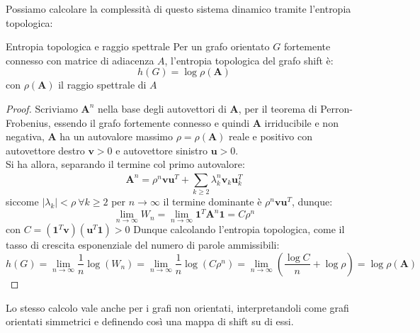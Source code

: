 Possiamo calcolare la complessità di questo sistema dinamico tramite l'entropia topologica:
\begin{boxb}{Entropia topologica e raggio spettrale}
   Per un grafo orientato $G$ fortemente connesso con matrice di adiacenza $A$, l'entropia topologica del grafo shift è:
   \begin{equation}
    h(G)=\log \rho(\mathbf{A})
   \end{equation} 
   con $\rho(\mathbf{A})$ il raggio spettrale di $A$
\end{boxb}

\begin{proof}
Scriviamo $\mathbf{A}^n$ nella base degli autovettori di $\mathbf{A}$, per il teorema di Perron-Frobenius, essendo il grafo fortemente connesso e quindi $\mathbf{A}$ irriducibile e non negativa, $\mathbf{A}$ ha un autovalore massimo $\rho=\rho(\mathbf{A})$ reale e positivo con autovettore destro $\mathbf{v}>0$ e autovettore sinistro $\mathbf{u}>0$.\\
Si ha allora, separando il termine col primo autovalore:
\begin{equation}
\mathbf{A}^n=\rho^n\mathbf{v}\mathbf{u}^T + \sum_{k \ge 2}^{}\lambda_k^n \mathbf{v}_k\mathbf{u}_k^T
\end{equation}
siccome $\left\lvert \lambda_k\right\rvert < \rho \ \forall k \ge 2$ per $n \to \infty$ il termine dominante è $\rho^n\mathbf{v}\mathbf{u}^T$, dunque:
\begin{equation}
    \lim_{n \to \infty}W_n=\lim_{n \to \infty }\mathbf{1}^T\mathbf{A}^n\mathbf{1} = C \rho^n
\end{equation}
con $C=(\mathbf{1}^T\mathbf{v})(\mathbf{u}^T\mathbf{1}) >0$
Dunque calcolando l'entropia topologica, come il tasso di crescita esponenziale del numero di parole ammissibili:
\begin{equation}
    h(G)=\lim_{n \to \infty}\frac{1}{n}\log(W_n)=\lim_{n \to \infty} \frac{1}{n} \log(C \rho^n)=\lim_{n \to \infty} \left( \frac{\log C}{n}+\log \rho\right)=\log \rho(\mathbf{A})
\end{equation}
\end{proof}
Lo stesso calcolo vale anche per i grafi non orientati, interpretandoli come grafi orientati simmetrici e definendo così una mappa di shift su di essi.\\

